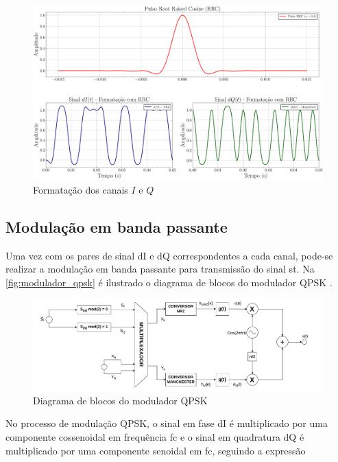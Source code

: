 \begin{figure}[H]
	\caption{Formatação dos canais $I$ e $Q$}\label{fig:pulso_rrc_e_sinais_iq}
	\includegraphics[width=\linewidth]{assets/pulso_rrc_e_sinais_iq.pdf}
\end{figure}



\subsection{Modulação em banda passante} 

Uma vez com os pares de sinal \gls{dI} e \gls{dQ} correspondentes a cada canal, pode-se realizar a modulação em banda passante para transmissão do sinal \gls{st}. Na \autoref{fig:modulador_qpsk} é ilustrado o diagrama de blocos do modulador \gls{QPSK} \cite{cnes_services_and_message_formats_ed2_rev2_2006}.

\begin{figure}[H]
	\centering
	\caption{Diagrama de blocos do modulador QPSK}\label{fig:modulador_qpsk}
	\includegraphics[width=\linewidth]{assets/modulador.pdf}
\end{figure}

No processo de modulação QPSK, o sinal em fase \gls{dI} é multiplicado por uma componente cossenoidal em frequência \gls{fc} e o sinal em quadratura \gls{dQ} é multiplicado por uma componente senoidal em \gls{fc}, seguindo a expressão

